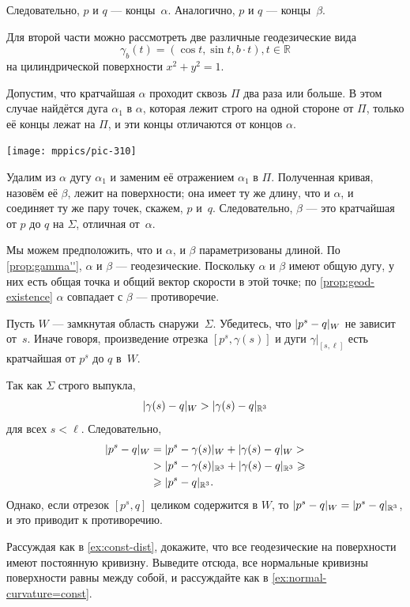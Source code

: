 \begin{multicols}{2}
Следовательно, $p$ и $q$ --- концы~$\alpha$.
Аналогично, $p$ и $q$ --- концы~$\beta$.

Для второй части можно рассмотреть две различные геодезические вида 
\[ \gamma_b(t) = ( \cos t , \sin t , b\cdot t ) , t \in \mathbb{R} \]
на цилиндрической поверхности $x^2 + y^2 =1$.

Допустим, что кратчайшая $\alpha$ проходит сквозь $\Pi$ два раза или больше.
В этом случае найдётся дуга $\alpha_1$ в $\alpha$, которая лежит строго на одной стороне от $\Pi$, только её концы лежат на $\Pi$, и эти концы отличаются от концов $\alpha$.

\begin{Figure}
\vskip-1mm
\centering
\texttt{[image: mppics/pic-310]}
\vskip-1mm
\end{Figure}

Удалим из $\alpha$ дугу $\alpha_1$ и заменим её отражением $\alpha_1$ в $\Pi$.
Полученная кривая, назовём её $\beta$, лежит на поверхности;
она имеет ту же длину, что и $\alpha$, и соединяет ту же пару точек, скажем, $p$ и~$q$.
Следовательно, $\beta$ --- это кратчайшая от $p$ до $q$ на $\Sigma$, отличная от~$\alpha$.

Мы можем предположить, что и $\alpha$, и $\beta$ параметризованы длиной.
По \ref{prop:gamma''}, $\alpha$ и $\beta$ --- геодезические.
Поскольку $\alpha$ и $\beta$ имеют общую дугу, у них есть общая точка и общий вектор скорости в этой точке;
по \ref{prop:geod-existence} $\alpha$ совпадает с $\beta$ --- противоречие.

Пусть $W$ --- замкнутая область снаружи~$\Sigma$.
Убедитесь, что $\dist{p^s}{q}W$ не зависит от~$s$.
Иначе говоря, произведение отрезка $[p^s,\gamma(s)]$ и дуги $\gamma|_{[s,\ell]}$ есть кратчайшая от $p^s$ до $q$ в~$W$.

Так как $\Sigma$ строго выпукла, 
\[ \dist{\gamma (s)}{q}W > \dist{\gamma(s)}{q}{\mathbb{R}^3} \]
для всех $s < \ell$.
Следовательно,
\begin{align*}
\dist{p^s}{q}W&=\dist{p^s}{\gamma(s)}W+\dist{\gamma (s)}{q}W 
> 
\\
&>\dist{p^s}{\gamma(s)}{\mathbb{R}^3} + \dist{ \gamma (s)}{q}{\mathbb{R}^3} 
\ge
\\
&\ge\dist{p^s}{q}{\mathbb{R}^3}. 
\end{align*}
Однако, если отрезок $[p^s,q]$ целиком содержится в $W$, то $\dist{p^s}{q}W = \dist{p^s}{q}{\mathbb{R}^3}$, и это приводит к противоречию.

Рассуждая как в \ref{ex:const-dist}, докажите, что все геодезические на поверхности  имеют постоянную кривизну.
Выведите отсюда, все нормальные кривизны поверхности равны между собой, и рассуждайте как в \ref{ex:normal-curvature=const}.


\end{multicols}
